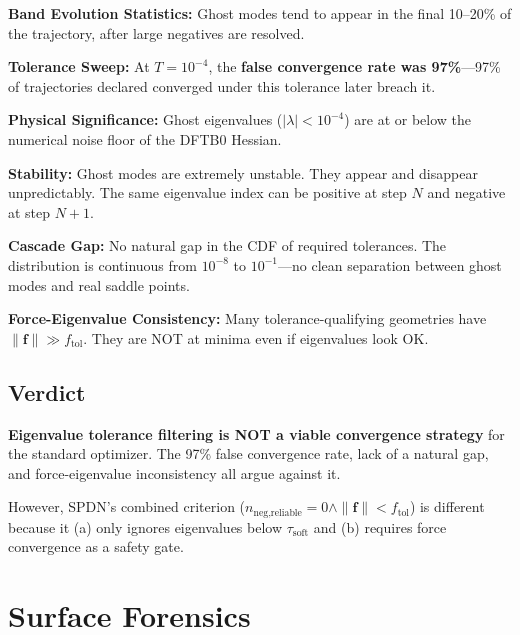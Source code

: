 \documentclass[11pt,a4paper]{article}
\newcommand{\vect}[1]{\mathbf{#1}}
\newcommand{\eval}{\lambda}
\begin{document}
\begin{description}[leftmargin=!,labelwidth=\widthof{\textbf{A1.}}]
  \item[A1.] \textbf{Band Evolution Statistics:} Ghost modes tend to appear in the final 10--20\% of the trajectory, after large negatives are resolved.
  \item[A2.] \textbf{Tolerance Sweep:} At $T = 10^{-4}$, the \textbf{false convergence rate was 97\%}---97\% of trajectories declared converged under this tolerance later breach it.
  \item[A3.] \textbf{Physical Significance:} Ghost eigenvalues ($|\eval| < 10^{-4}$) are at or below the numerical noise floor of the DFTB0 Hessian.
  \item[A4.] \textbf{Stability:} Ghost modes are extremely unstable. They appear and disappear unpredictably. The same eigenvalue index can be positive at step $N$ and negative at step $N\!+\!1$.
  \item[A5.] \textbf{Cascade Gap:} No natural gap in the CDF of required tolerances. The distribution is continuous from $10^{-8}$ to $10^{-1}$---no clean separation between ghost modes and real saddle points.
  \item[A6.] \textbf{Force-Eigenvalue Consistency:} Many tolerance-qualifying geometries have $\|\vect{f}\| \gg f_\text{tol}$. They are NOT at minima even if eigenvalues look OK.
\end{description}

\subsection{Verdict}

\textbf{Eigenvalue tolerance filtering is NOT a viable convergence strategy} for the standard optimizer. The 97\% false convergence rate, lack of a natural gap, and force-eigenvalue inconsistency all argue against it.

However, SPDN's combined criterion ($n_\text{neg,reliable} = 0 \wedge \|\vect{f}\| < f_\text{tol}$) is different because it (a) only ignores eigenvalues below $\tau_\text{soft}$ and (b) requires force convergence as a safety gate.

\section{Surface Forensics}
\label{sec:forensics}
\end{document}
